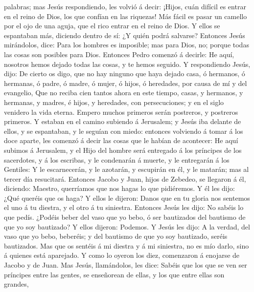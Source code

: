 palabras; mas Jesús respondiendo, les volvió á decir: ¡Hijos, cuán
difícil es entrar en el reino de Dios, los que confían en las riquezas!
 Más fácil es pasar un camello por el ojo de una aguja,
que el rico entrar en el reino de Dios.  Y ellos se
espantaban más, diciendo dentro de sí: ¿Y quién podrá salvarse?
 Entonces Jesús mirándolos, dice: Para los hombres es
imposible; mas para Dios, no; porque todas las cosas son posibles para
Dios.  Entonces Pedro comenzó á decirle: He aquí,
nosotros hemos dejado todas las cosas, y te hemos seguido.
 Y respondiendo Jesús, dijo: De cierto os digo, que no
hay ninguno que haya dejado casa, ó hermanos, ó hermanas, ó padre, ó
madre, ó mujer, ó hijos, ó heredades, por causa de mí y del evangelio,
 Que no reciba cien tantos ahora en este tiempo, casas, y
hermanos, y hermanas, y madres, é hijos, y heredades, con persecuciones;
y en el siglo venidero la vida eterna.  Empero muchos
primeros serán postreros, y postreros primeros.  Y
estaban en el camino subiendo á Jerusalem; y Jesús iba delante de ellos,
y se espantaban, y le seguían con miedo: entonces volviendo á tomar á
los doce aparte, les comenzó á decir las cosas que le habían de
acontecer:  He aquí subimos á Jerusalem, y el Hijo del
hombre será entregado á los príncipes de los sacerdotes, y á los
escribas, y le condenarán á muerte, y le entregarán á los Gentiles:
 Y le escarnecerán, y le azotarán, y escupirán en él, y
le matarán; mas al tercer día resucitará.  Entonces
Jacobo y Juan, hijos de Zebedeo, se llegaron á él, diciendo: Maestro,
querríamos que nos hagas lo que pidiéremos.  Y él les
dijo: ¿Qué queréis que os haga?  Y ellos le dijeron:
Danos que en tu gloria nos sentemos el uno á tu diestra, y el otro á tu
siniestra.  Entonces Jesús les dijo: No sabéis lo que
pedís. ¿Podéis beber del vaso que yo bebo, ó ser bautizados del bautismo
de que yo soy bautizado?  Y ellos dijeron: Podemos. Y
Jesús les dijo: A la verdad, del vaso que yo bebo, beberéis; y del
bautismo de que yo soy bautizado, seréis bautizados.  Mas
que os sentéis á mi diestra y á mi siniestra, no es mío darlo, sino á
quienes está aparejado.  Y como lo oyeron los diez,
comenzaron á enojarse de Jacobo y de Juan.  Mas Jesús,
llamándolos, les dice: Sabéis que los que se ven ser príncipes entre las
gentes, se enseñorean de ellas, y los que entre ellas son grandes,
